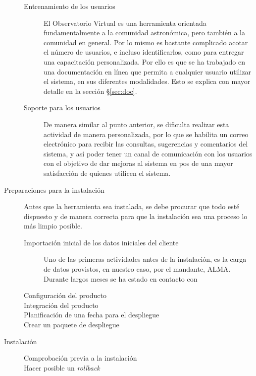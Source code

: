 \begin{description}
\begin{description}
			\item [Entrenamiento de los usuarios] El Observatorio Virtual es una herramienta orientada fundamentalmente a la comunidad astronómica, pero tambi\'en a la comunidad en general. Por lo mismo es bastante complicado acotar el número de usuarios, e incluso identificarlos, como para entregar una capacitación personalizada. Por ello es que se ha trabajado en una documentación en línea que permita a cualquier usuario utilizar el sistema, en sus diferentes modalidades. Esto se explica con mayor detalle en la sección \S\ref{sec:doc}.
			\item [Soporte para los usuarios] De manera similar al punto anterior, se dificulta realizar esta actividad de manera personalizada, por lo que se habilita un correo electrónico\footnotemark{} para recibir las consultas, sugerencias y comentarios del sistema, y así poder tener un canal de comunicación con los usuarios con el objetivo de dar mejoras al sistema en pos de una mayor satisfacción de quienes utilicen el sistema.
		\end{description}
	\item [Preparaciones para la instalación] Antes que la herramienta sea instalada, se debe procurar que todo est\'e dispuesto y de manera correcta para que la instalación sea una proceso lo más limpio posible.
		\begin{description}
			\item [Importación inicial de los datos iniciales del cliente] Uno de las primeras actividades antes de la instalación, es la carga de datos provistos, en nuestro caso, por el mandante, ALMA. Durante largos meses se ha estado en contacto con
			\item [Configuración del producto]
			\item [Integración del producto]
			\item [Planificación de una fecha para el despliegue]
			\item [Crear un paquete de despliegue]
		\end{description}
	\item [Instalación]
		\begin{description}
			\item [Comprobación previa a la instalación]
			\item [Hacer posible un \emph{rollback}]

\end{description}
\end{description}
